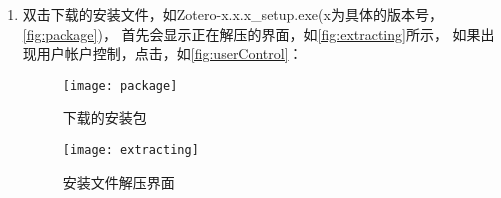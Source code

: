\documentclass[cn,11pt,chinese]{elegantbook}
\begin{document}
		\begin{enumerate}
			\item 双击下载的安装文件，如Zotero-x.x.x\_setup.exe(x为具体的版本号，\autoref{fig:package})，
			首先会显示正在解压的界面，如\autoref{fig:extracting}所示，
			如果出现用户帐户控制，点击，如\autoref{fig:userControl}：
			\begin{figure}[htbp]
				\centering
				\begin{minipage}[t]{\dimexpr0.5\textwidth-4em}
					\centering
					\texttt{[image: package]}
					\caption{下载的安装包}
					\label{fig:package}
				\end{minipage}
				\begin{minipage}[t]{\dimexpr0.5\textwidth-4em}
					\centering
					\texttt{[image: extracting]}
					\caption{安装文件解压界面}
					\label{fig:extracting}
				\end{minipage}
			\end{figure}
			

\end{enumerate}
\end{document}
